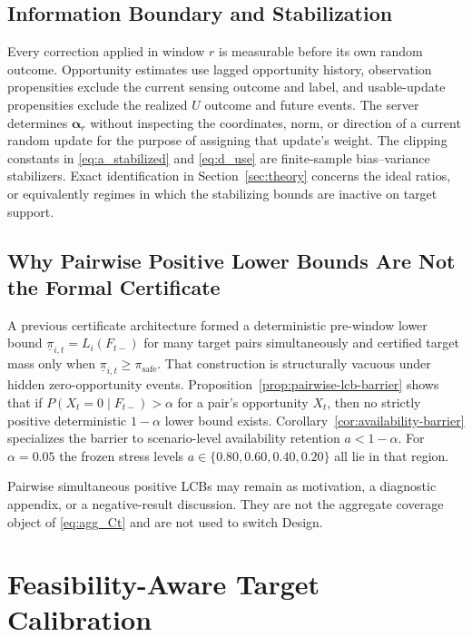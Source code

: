 \documentclass[letterpaper,journal]{IEEEtran}
\begin{document}
\subsection{Information Boundary and Stabilization}
\label{subsec:information_boundary}

Every correction applied in window $r$ is measurable before its own random
outcome.  Opportunity estimates use lagged opportunity history,
observation propensities exclude the current sensing outcome and label,
and usable-update propensities exclude the realized $U$ outcome and
future events.  The server determines $\boldsymbol\alpha_r$ without
inspecting the coordinates, norm, or direction of a current random
update for the purpose of assigning that update's weight.  The clipping
constants in \eqref{eq:a_stabilized} and \eqref{eq:d_use} are
finite-sample bias--variance stabilizers.  Exact identification in
Section~\ref{sec:theory} concerns the ideal ratios, or equivalently
regimes in which the stabilizing bounds are inactive on target support.

\subsection{Why Pairwise Positive Lower Bounds Are Not the Formal Certificate}
\label{subsec:pairwise_barrier}

A previous certificate architecture formed a deterministic pre-window lower
bound $\underline{\pi}_{i,t}=L_i(F_{t-})$ for many target pairs simultaneously
and certified target mass only when $\underline{\pi}_{i,t}\ge\pi_{\mathrm{safe}}$.
That construction is structurally vacuous under hidden zero-opportunity events.
Proposition~\ref{prop:pairwise-lcb-barrier} shows that if
$P(X_t=0\mid F_{t-})>\alpha$ for a pair's opportunity $X_t$, then no strictly
positive deterministic $1-\alpha$ lower bound exists.  Corollary~\ref{cor:availability-barrier}
specializes the barrier to scenario-level availability retention $a<1-\alpha$.
For $\alpha=0.05$ the frozen stress levels $a\in\{0.80,0.60,0.40,0.20\}$ all
lie in that region.

Pairwise simultaneous positive LCBs may remain as motivation, a diagnostic
appendix, or a negative-result discussion.  They are not the aggregate
coverage object of \eqref{eq:agg_Ct} and are not used to switch Design.


\section{Feasibility-Aware Target Calibration}
\label{sec:calibration}
\end{document}
